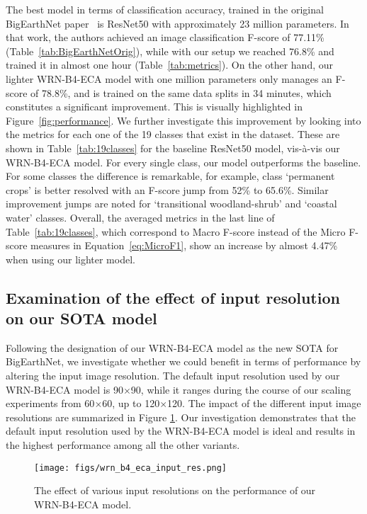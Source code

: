 \documentclass[journal]{IEEEtran}
\begin{document}
The best model in terms of classification accuracy, trained in the original BigEarthNet paper~\citep{sumbul2020bigearthnet} is ResNet50 with approximately 23 million parameters. In that work, the authors achieved an image classification F-score of 77.11\% (Table~\ref{tab:BigEarthNetOrig}), while with our setup we reached 76.8\% and trained it in almost one hour (Table~\ref{tab:metrics}). On the other hand, our lighter WRN-B4-ECA model with one million parameters only manages an F-score of 78.8\%, and is trained on the same data splits in 34 minutes, which constitutes a significant improvement. This is visually highlighted in Figure~\ref{fig:performance}. We further investigate this improvement by looking into the metrics for each one of the 19 classes that exist in the dataset. These are shown in Table~\ref{tab:19classes} for the baseline ResNet50 model, vis-à-vis our WRN-B4-ECA model. For every single class, our model outperforms the baseline. For some classes the difference is remarkable, for example, class `permanent crops' is better resolved with an F-score jump from 52\% to 65.6\%. Similar improvement jumps are noted for `transitional woodland-shrub' and `coastal water' classes. Overall, the averaged metrics in the last line of Table~\ref{tab:19classes}, which correspond to Macro F-score instead of the Micro F-score measures in Equation~\ref{eq:MicroF1}, show an increase by almost 4.47\% when using our lighter model.

\subsection{Examination of the effect of input resolution on our SOTA model}
Following the designation of our WRN-B4-ECA model as the new SOTA for BigEarthNet, we investigate whether we could benefit in terms of performance by altering the input image resolution. The default input resolution used by our WRN-B4-ECA model is 90$\times$90, while it ranges during the course of our scaling experiments from 60$\times$60, up to 120$\times$120. The impact of the different input image resolutions are summarized in Figure \ref{fig:wrn_b4_eca_input_res}. Our investigation demonstrates that the default input resolution used by the WRN-B4-ECA model is ideal and results in the highest performance among all the other variants.


\begin{figure}[ht]
\centering
 \texttt{[image: figs/wrn\_b4\_eca\_input\_res.png]}
\caption{The effect of various input resolutions on the performance of our WRN-B4-ECA model.}
\label{fig:wrn_b4_eca_input_res}
\end{figure}
\end{document}
